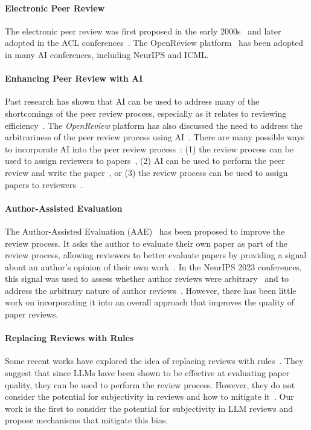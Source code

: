 \documentclass{article} %
\begin{document}
\paragraph{Electronic Peer Review}
The electronic peer review was first proposed in the early 2000s~\citep{bornmann2007we,facey2017educational,gibson2015digital,warne2016rewarding} and later adopted in the ACL conferences~\citep{nicholson2016brief,tran2020open}. The OpenReview platform~\citep{tran2020open} has been adopted in many AI conferences, including NeurIPS and ICML. 
\paragraph{Enhancing Peer Review with AI} 
Past research has shown that AI can be used to address many of the shortcomings of the peer review process, especially as it relates to reviewing efficiency~\citep{rogers2020can, liu2023reviewergpt}. The \textit{OpenReview} platform has also discussed the need to address the arbitrariness of the peer review process using AI~\cite{tran2020open}. There are many possible ways to incorporate AI into the peer review process~\cite{checco2021ai, kuznetsov2024can}: (1) the review process can be used to assign reviewers to papers~\cite{zhang2022system,mimno2007expertise}, (2) AI can be used to perform the peer review and write the paper~\cite{lu2024ai}, or (3) the review process can be used to assign papers to reviewers~\citep{stelmakh2021novice}. 
\paragraph{Author-Assisted Evaluation}
The Author-Assisted Evaluation (AAE)~\citep{su2021you,wu2023isotonic} has been proposed to
improve the review process. It asks the author to evaluate their own paper as part of the review process, allowing reviewers to better evaluate papers by providing a signal about an author’s opinion of their own work~\citep{centeno2015inaccuracy}. In the NeurIPS 2023 conferences, this signal was used to assess whether author reviews were arbitrary~\citep{beygelzimer2023has} and to address the arbitrary nature of author reviews~\citep{cortes2021inconsistency}. However, there has been little work on incorporating it into an overall approach that improves the quality of paper reviews. 

\paragraph{Replacing Reviews with Rules} 
Some recent works have explored the idea of replacing reviews with rules~\citep{liu2023reviewergpt, xuneurips}. They suggest that since LLMs have been shown to be effective at evaluating paper quality, they can be used to perform the review process. However, they do not consider the potential for subjectivity in reviews and how to mitigate it~\cite{liu2023reviewergpt, xuneurips}. Our work is the first to consider the potential for subjectivity in LLM reviews and propose mechanisms that mitigate this bias.
\end{document}
